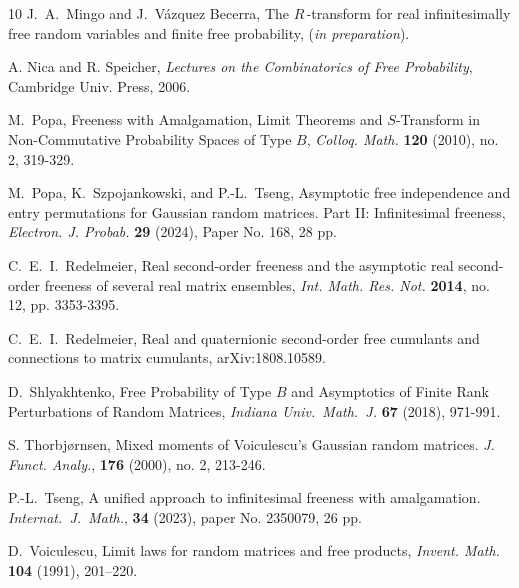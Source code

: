 \documentclass[11pt]{amsart}
\theoremstyle{definition}
\numberwithin{theorem}{section}
\newcommand{\xx}[2]{\relax}
\newcommand{\thebottomline}{\renewcommand{\thefootnote}{}
  \renewcommand{\footnoterule}{}
  \phantom{M}\footnotetext{\tiny\textit{\jobname.tex}\hfill
    \textit{\noindent\romannumeral\day.%
\romannumeral\month.\expandafter\xx\romannumeral\year}}}
\renewcommand{\thefootnote}{(\arabic{footnote})}
\begin{document}
\begin{thebibliography}{10}
 J.~A.~Mingo and J.~Vázquez Becerra, The
  ${R}\,$-transform for real infinitesimally free random
  variables and finite free probability, (\textit{in
    preparation}).

 A. Nica and R. Speicher, \textit{Lectures on
  the Combinatorics of Free Probability}, Cambridge
  Univ. Press, 2006.

 M.~Popa, Freeness with Amalgamation, Limit
  Theorems and $S$-Transform in Non-Commutative Probability
  Spaces of Type $B$, \textit{Colloq. Math.} \textbf{120}
  (2010), no. 2, 319-329.

M.~Popa, K.~Szpojankowski, and P.-L.~Tseng,
  Asymptotic free independence and entry permutations for
  Gaussian random matrices. Part II: Infinitesimal freeness,
  \textit{Electron. J. Probab.} \textbf{29} (2024), Paper
  No. 168, 28 pp.
  
 C.~E.~I.~Redelmeier, Real second-order freeness
  and the asymptotic real second-order freeness of several
  real matrix ensembles, \textit{Int. Math. Res. Not.}
  \textbf{2014}, no. 12, pp. 3353-3395.
 
 C.~E.~I.~Redelmeier, Real and quaternionic
  second-order free cumulants and connections to matrix
  cumulants, arXiv:1808.10589.
  
 D.~Shlyakhtenko, Free Probability of Type $B$ and
  Asymptotics of Finite Rank Perturbations of Random
  Matrices, \textit{Indiana Univ.~Math.~J.} \textbf{67}
  (2018), 971-991.

 S. Thorbjørnsen, Mixed moments of Voiculescu's
  Gaussian random matrices. \textit{J. Funct. Analy.},
  \textbf{176} (2000), no. 2, 213-246.

 P.-L.~Tseng, A unified approach to infinitesimal
  freeness with amalgamation. {\em Internat.~J.~Math.},
  \textbf{34} (2023), paper No. 2350079, 26 pp.

 D.~Voiculescu, Limit laws for random
  matrices and free products, \textit{Invent. Math.}
  \textbf{104} (1991), 201--220.
  
\end{thebibliography}

\thebottomline
\end{document}
